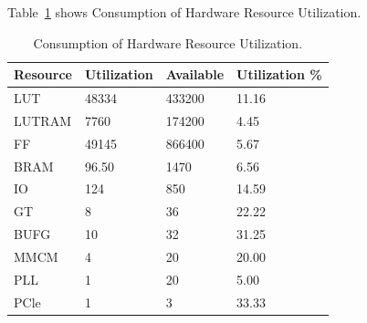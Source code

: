 Table~\ref{tab:resource utilization} shows Consumption of Hardware Resource Utilization.
\begin{table}[]
    \caption{Consumption of Hardware Resource Utilization.}
    \begin{tabular}{|l|l|l|l|}
    \hline
    Resource & Utilization & Available & Utilization \% \\ \hline
    LUT      & 48334       & 433200    & 11.16          \\ \hline
    LUTRAM   & 7760        & 174200    & 4.45           \\ \hline
    FF       & 49145       & 866400    & 5.67           \\ \hline
    BRAM     & 96.50       & 1470      & 6.56           \\ \hline
    IO       & 124         & 850       & 14.59          \\ \hline
    GT       & 8           & 36        & 22.22          \\ \hline
    BUFG     & 10          & 32        & 31.25          \\ \hline
    MMCM     & 4           & 20        & 20.00          \\ \hline
    PLL      & 1           & 20        & 5.00           \\ \hline
    PCle     & 1           & 3         & 33.33          \\ \hline
    \end{tabular}
    \label{tab:resource utilization} 
    \end{table}


